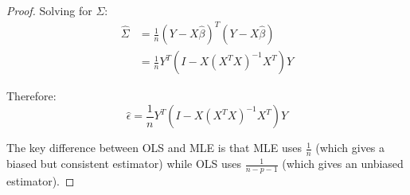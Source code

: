 \begin{proof}
    Solving for $\Sigma$:
    \begin{align}
      \hat{\Sigma} &= \frac{1}{n}(Y - X\hat{\beta})^T(Y - X\hat{\beta}) \\
      &= \frac{1}{n}Y^T(I - X(X^TX)^{-1}X^T)Y
    \end{align}
   
    Therefore:
    \begin{equation}
      \hat{\epsilon} = \frac{1}{n}Y^T(I - X(X^TX)^{-1}X^T)Y
    \end{equation}
   
    The key difference between OLS and MLE is that MLE uses $\frac{1}{n}$ (which gives a biased but consistent estimator) while OLS uses $\frac{1}{n-p-1}$ (which gives an unbiased estimator).
  \end{proof}

